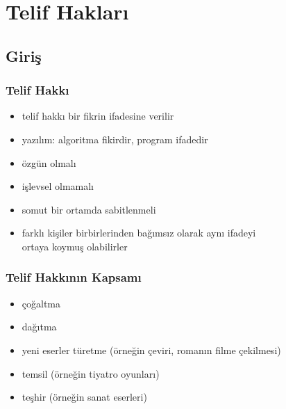 \documentclass[dvipsnames]{beamer}
\theoremstyle{definition}
\theoremstyle{example}
\theoremstyle{plain}
\begin{document}
\section{Telif Hakları}

\subsection{Giriş}

\begin{frame}
  \frametitle{Telif Hakkı}

  \begin{itemize}
    \item telif hakkı bir fikrin \alert{ifadesine} verilir
    \item yazılım: algoritma fikirdir, program ifadedir

    \pause
    \medskip
    \item özgün olmalı
    \item işlevsel olmamalı
    \item somut bir ortamda sabitlenmeli

    \pause
    \medskip
    \item farklı kişiler birbirlerinden bağımsız olarak aynı ifadeyi\\
      ortaya koymuş olabilirler
  \end{itemize}
\end{frame}

\begin{frame}
  \frametitle{Telif Hakkının Kapsamı}

  \begin{itemize}
    \item çoğaltma
    \item dağıtma
    \item yeni eserler türetme (örneğin çeviri, romanın filme çekilmesi)
    \item temsil (örneğin tiyatro oyunları)
    \item teşhir (örneğin sanat eserleri)
  \end{itemize}
\end{frame}
\end{document}
